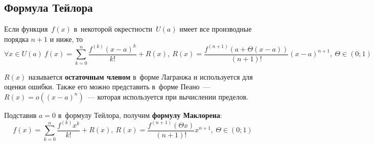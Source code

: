 \subsection{Формула Тейлора}
\begin{theorem}
\label{eq:Taylor_series}
Если функция~$f(x)$ в~некоторой окрестности~$U(a)$ имеет все производные порядка $n + 1$ и ниже, то
\begin{equation*}
\forall x \in U(a) \
f(x) = \sum_{k=0}^n \frac{f^{(k)} (x - a)^k}{k!} + R(x), \
R(x) = \frac{f^{(n + 1)}(a + \Theta(x - a))}{(n + 1)!}(x - a)^{n + 1}, \
\Theta \in (0; 1)
\end{equation*}
\end{theorem}

$R(x)$ называется \textbf{остаточным членом} в~форме Лагранжа и используется для оценки ошибки. Также его можно представить в~форме Пеано~--- $R(x) = o((x - a)^n)$~--- которая используется при вычислении пределов.

Подставив $a = 0$ в~формулу Тейлора, получим \textbf{формулу Маклорена}:
\begin{equation}
\label{eq:Maclaurin_series}
f(x) = \sum_{k=0}^n \frac{f^{(k)} x^k}{k!} + R(x), \
R(x) = \frac{f^{(n + 1)}(\Theta x)}{(n + 1)!} x^{n + 1}, \
\Theta \in (0; 1)
\end{equation}

